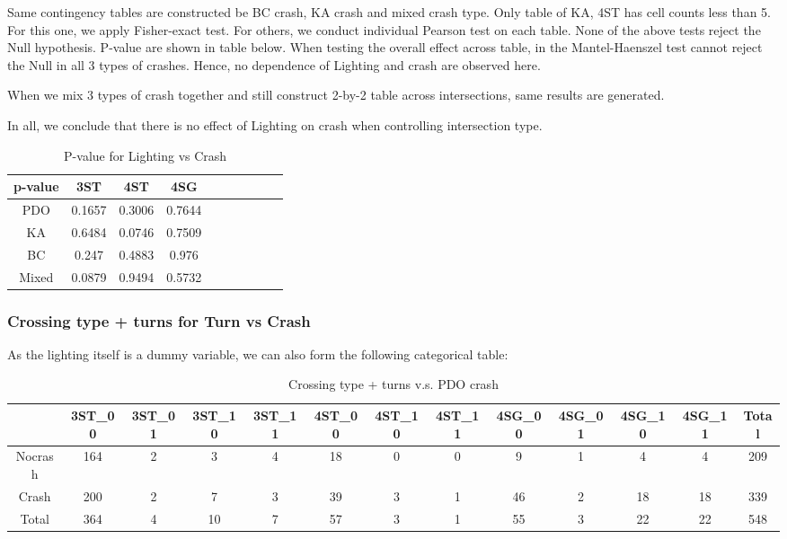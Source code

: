 \documentclass[11pt]{scrartcl} %
\begin{document}
Same contingency tables are constructed be BC crash, KA crash and mixed crash type. Only table of KA, 4ST has cell counts less than 5. For this one, we apply Fisher-exact test. For others, we conduct individual Pearson test on each table. None of the above tests reject the Null hypothesis. P-value are shown in table below. When testing the overall effect across table, in the Mantel-Haenszel test cannot reject the Null in all 3 types of crashes. Hence, no dependence of Lighting and crash are observed here.

When we mix 3 types of crash together and still construct 2-by-2 table across intersections, same results are generated.

In all, we conclude that there is no effect of Lighting on crash when controlling intersection type.

\begin{table}[H]
\caption{P-value for Lighting vs Crash}
\centering
\begin{tabular}{|c|c|c|c|c|c|c|c|c|c|}
\hline
p-value & 3ST & 4ST & 4SG  \\
\hline
PDO & 0.1657 & 0.3006 & 0.7644 \\
\hline
KA & 0.6484 & 0.0746 & 0.7509\\
\hline
BC & 0.247  & 0.4883 & 0.976 \\
\hline
Mixed & 0.0879 & 0.9494 & 0.5732 \\
\hline
\end{tabular}
\end{table}


\subsubsection{Crossing type + turns for Turn vs Crash}

As the lighting itself is a dummy variable, we can also form the following categorical table:

\begin{table}[H]
\caption{Crossing type + turns v.s. PDO crash}
\centering
\tiny
\begin{tabular}{|c|c|c|c|c|c|c|c|c|c|c|c|c|}
\hline
      & 3ST\_00 & 3ST\_01 & 3ST\_10 & 3ST\_11 & 4ST\_00 & 4ST\_10 & 4ST\_11 & 4SG\_00 & 4SG\_01 & 4SG\_10 & 4SG\_11 & Total \\
\hline
Nocrash & 164  & 2 & 3 & 4 & 18 & 0 & 0 & 9 & 1 & 4 & 4 & 209\\
\hline
Crash   & 200  & 2 & 7 & 3 & 39 & 3 & 1 & 46 & 2 & 18 & 18 & 339 \\
\hline
Total   & 364  & 4 & 10 & 7 & 57 & 3 & 1 & 55 & 3 & 22 & 22 & 548\\
\hline
\end{tabular}
\end{table}
\end{document}
